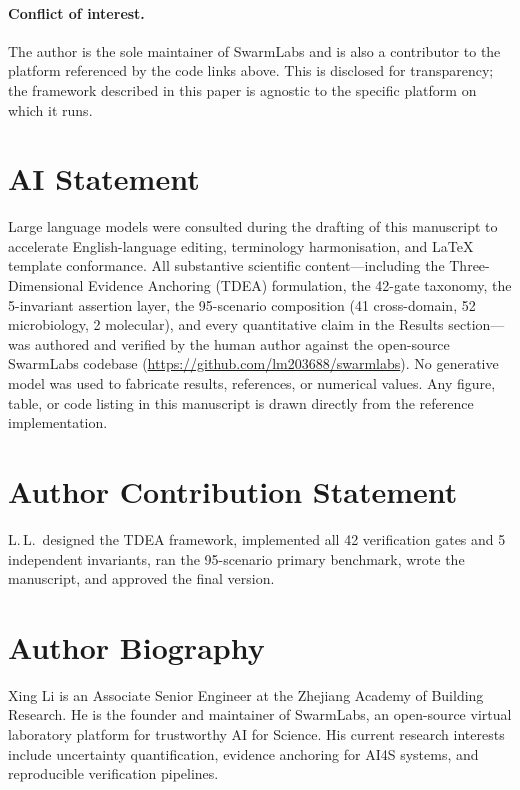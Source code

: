 \documentclass[review,3p]{elsarticle}
\begin{document}
\paragraph{Conflict of interest.}
The author is the sole maintainer of SwarmLabs and is also a contributor to the platform referenced by the code links above. This is disclosed for transparency; the framework described in this paper is agnostic to the specific platform on which it runs.


\section*{AI Statement}
Large language models were consulted during the drafting of this manuscript to accelerate English-language editing, terminology harmonisation, and LaTeX template conformance. All substantive scientific content---including the Three-Dimensional Evidence Anchoring (TDEA) formulation, the 42-gate taxonomy, the 5-invariant assertion layer, the 95-scenario composition (41 cross-domain, 52 microbiology, 2 molecular), and every quantitative claim in the Results section---was authored and verified by the human author against the open-source SwarmLabs codebase (\url{https://github.com/lm203688/swarmlabs}). No generative model was used to fabricate results, references, or numerical values. Any figure, table, or code listing in this manuscript is drawn directly from the reference implementation.

\section*{Author Contribution Statement}
L.\,L.\ designed the TDEA framework, implemented all 42 verification gates and 5 independent invariants, ran the 95-scenario primary benchmark, wrote the manuscript, and approved the final version.

\section*{Author Biography}
Xing Li is an Associate Senior Engineer at the Zhejiang Academy of Building Research. He is the founder and maintainer of SwarmLabs, an open-source virtual laboratory platform for trustworthy AI for Science. His current research interests include uncertainty quantification, evidence anchoring for AI4S systems, and reproducible verification pipelines.
\end{document}
